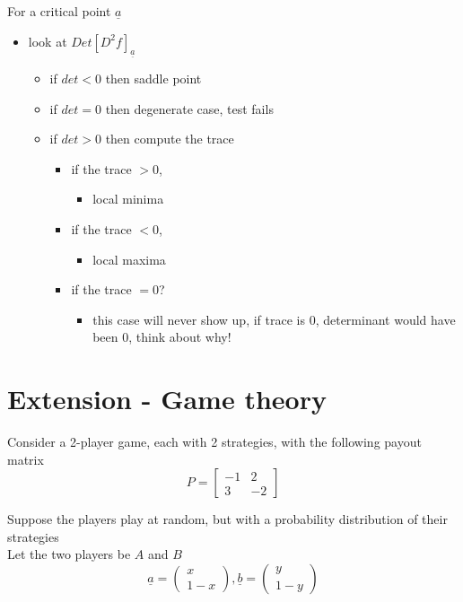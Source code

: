 For a critical point $ \underline{a}$
\begin{itemize}
   \item look at $Det \left[ D^2 f \right]_{ \underline{a}} $
      \begin{itemize}
         \item if $det < 0$ then saddle point 
         \item if $det = 0$ then degenerate case, test fails
         \item if $det > 0$ then compute the trace 
            \begin{itemize}
               \item if the trace $>0$,               
                  \begin{itemize}
                     \item local minima
                  \end{itemize}
               \item if the trace $<0$,               
                  \begin{itemize}
                     \item local maxima
                  \end{itemize}
               \item if the trace $=0$?
                  \begin{itemize}
                     \item this case will never show up, if trace is $0$, determinant would have been $0$, think about why!
                  \end{itemize}
            \end{itemize}
      \end{itemize}
\end{itemize}

\section{Extension - Game theory}

Consider a 2-player game, each with 2 strategies, with the following payout matrix
\[
  P = \begin{bmatrix} 
     -1 & 2 \\ 3 & -2  
  \end{bmatrix}
\] 

Suppose the players play at random, but with a probability distribution of their strategies \\

Let the two players be $A$ and $B$ 
\[
  \underline{a} = \begin{pmatrix} x \\ 1-x \end{pmatrix} ,  \underline{b} = \begin{pmatrix} y \\ 1-y \end{pmatrix} 
\] 

